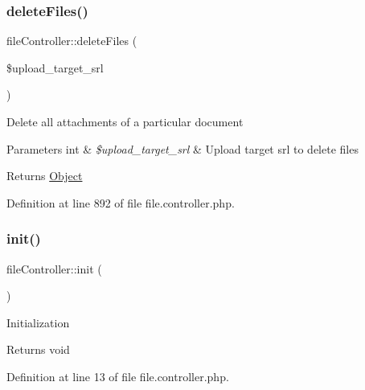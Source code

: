\mbox{\label{classfileController_ae3060e078930eeaae0c939d7a1c4f229}} 
\subsubsection{\texorpdfstring{delete\+Files()}{deleteFiles()}}
{\footnotesize\ttfamily file\+Controller\+::delete\+Files (\begin{DoxyParamCaption}\item[{}]{\$upload\+\_\+target\+\_\+srl }\end{DoxyParamCaption})}

Delete all attachments of a particular document


\begin{DoxyParams}[1]{Parameters}
int & {\em \$upload\+\_\+target\+\_\+srl} & Upload target srl to delete files \\
\hline
\end{DoxyParams}
\begin{DoxyReturn}{Returns}
\hyperlink{classObject}{Object} 
\end{DoxyReturn}


Definition at line 892 of file file.\+controller.\+php.

\mbox{\label{classfileController_aea1086732740ff005a00f7152e30937d}} 
\subsubsection{\texorpdfstring{init()}{init()}}
{\footnotesize\ttfamily file\+Controller\+::init (\begin{DoxyParamCaption}{ }\end{DoxyParamCaption})}

Initialization \begin{DoxyReturn}{Returns}
void 
\end{DoxyReturn}


Definition at line 13 of file file.\+controller.\+php.

\mbox{\label{classfileController_aa9247b382342e097dcd71dac7b944c50}} 
